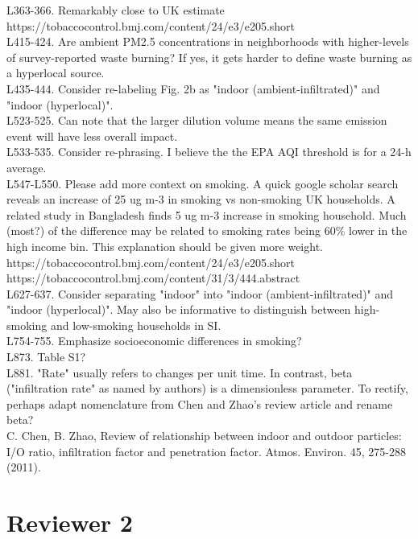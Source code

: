 \documentclass[12pt,english]{article}
\begin{document}
L363-366. Remarkably close to UK estimate https://tobaccocontrol.bmj.com/content/24/e3/e205.short
\\
L415-424. Are ambient PM2.5 concentrations in neighborhoods with higher-levels of survey-reported waste burning? If yes, it gets harder to define waste burning as a hyperlocal source.
\\
L435-444. Consider re-labeling Fig. 2b as "indoor (ambient-infiltrated)" and "indoor (hyperlocal)".
\\
L523-525. Can note that the larger dilution volume means the same emission event will have less overall impact.
\\
L533-535. Consider re-phrasing. I believe the the EPA AQI threshold is for a 24-h average.
\\
L547-L550. Please add more context on smoking. A quick google scholar search reveals an increase of 25 ug m-3 in smoking vs non-smoking UK households. A related study in Bangladesh finds 5 ug m-3 increase in smoking household. Much (most?) of the difference may be related to smoking rates being 60\% lower in the high income bin. This explanation should be given more weight.
\\
[1] https://tobaccocontrol.bmj.com/content/24/e3/e205.short \\
[2] https://tobaccocontrol.bmj.com/content/31/3/444.abstract
\\
L627-637. Consider separating "indoor" into "indoor (ambient-infiltrated)" and "indoor (hyperlocal)". May also be informative to distinguish between high-smoking and low-smoking households in SI.
\\
L754-755. Emphasize socioeconomic differences in smoking?
\\
L873. Table S1?
\\
L881. "Rate" usually refers to changes per unit time. In contrast, beta ("infiltration rate" as named by authors) is a dimensionless parameter. To rectify, perhaps adapt nomenclature from Chen and Zhao's review article and rename beta?
\\
C. Chen, B. Zhao, Review of relationship between indoor and outdoor particles: I/O ratio, infiltration factor and penetration factor. Atmos. Environ. 45, 275-288 (2011).



\section{Reviewer 2}
\end{document}
